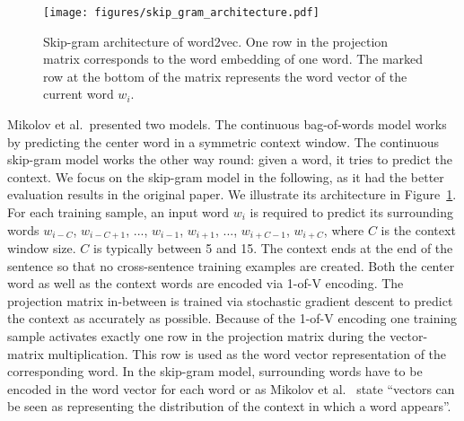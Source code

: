 \documentclass[
        a4paper,
        titlepage,
        twoside,
        parskip
        ]{scrbook}
\theoremstyle{break}
\begin{document}
\begin{figure}
       \centering
       \texttt{[image: figures/skip\_gram\_architecture.pdf]}
       \caption{Skip-gram architecture of word2vec.
       One row in the projection matrix corresponds to the word embedding of one word.
       The marked row at the bottom of the matrix represents the word vector of the current word $w_i$.}
       \label{fig:skip_gram_architecture}
\end{figure}

Mikolov et al.\ presented two models.
The continuous bag-of-words model works by predicting the center word in a symmetric context window.
The continuous skip-gram model works the other way round: given a word, it tries to predict the context.
We focus on the skip-gram model in the following, as it had the better evaluation results in the original paper.
We illustrate its architecture in Figure~\ref{fig:skip_gram_architecture}.
For each training sample, an input word $w_i$ is required to predict its surrounding words $w_{i - C}$, $w_{i - C + 1}$, ..., $w_{i - 1}$, $w_{i + 1}$, ..., $w_{i + C - 1}$, $w_{i + C}$, where $C$ is the context window size.
$C$ is typically between 5 and 15.
The context ends at the end of the sentence so that no cross-sentence training examples are created.
Both the center word as well as the context words are encoded via 1-of-V encoding.
The projection matrix in-between is trained via stochastic gradient descent to predict the context as accurately as possible.
Because of the 1-of-V encoding one training sample activates exactly one row in the projection matrix during the vector-matrix multiplication.
This row is used as the word vector representation of the corresponding word.
In the skip-gram model, surrounding words have to be encoded in the word vector for each word or as Mikolov et al.~\cite{Mikolov2013} state ``vectors can be seen as representing the distribution of the context in which a word appears''.
\end{document}
